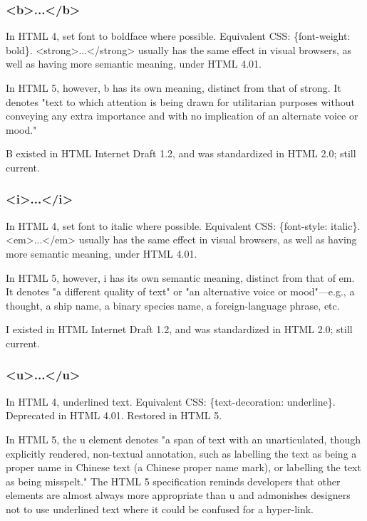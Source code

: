 \subsubsection{<b>...</b>}

In HTML 4, set font to boldface where possible. Equivalent CSS: \{font-weight: bold\}. <strong>...</strong> usually has the same effect in visual browsers, as well as having more semantic meaning, under HTML 4.01.

In HTML 5, however, b has its own meaning, distinct from that of strong. It denotes "text to which attention is being drawn for utilitarian purposes without conveying any extra importance and with no implication of an alternate voice or mood."

B existed in HTML Internet Draft 1.2, and was standardized in HTML 2.0; still current.


\subsubsection{<i>...</i>}

In HTML 4, set font to italic where possible. Equivalent CSS: \{font-style: italic\}. <em>...</em> usually has the same effect in visual browsers, as well as having more semantic meaning, under HTML 4.01.

In HTML 5, however, i has its own semantic meaning, distinct from that of em. It denotes "a different quality of text" or "an alternative voice or mood"—e.g., a thought, a ship name, a binary species name, a foreign-language phrase, etc.

I existed in HTML Internet Draft 1.2, and was standardized in HTML 2.0; still current.


\subsubsection{<u>...</u>}

In HTML 4, underlined text. Equivalent CSS: \{text-decoration: underline\}. Deprecated in HTML 4.01. Restored in HTML 5.



In HTML 5, the u element denotes "a span of text with an unarticulated, though explicitly rendered, non-textual annotation, such as labelling the text as being a proper name in Chinese text (a Chinese proper name mark), or labelling the text as being misspelt." The HTML 5 specification reminds developers that other elements are almost always more appropriate than u and admonishes designers not to use underlined text where it could be confused for a hyper-link.

